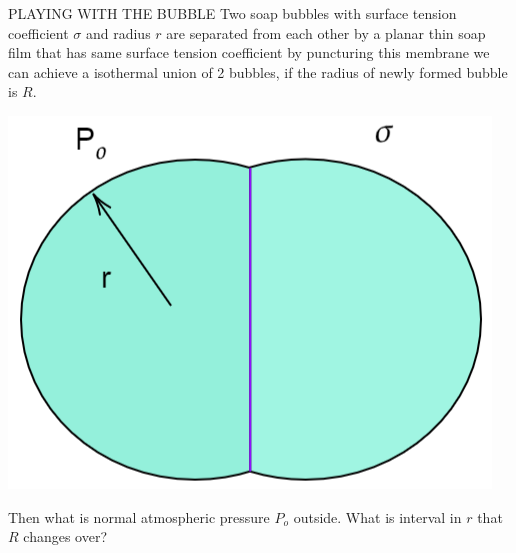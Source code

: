 \begin{qotdphybox}{PLAYING WITH THE BUBBLE}
Two soap bubbles with surface tension coefficient $\sigma$ and radius $r$ are separated from each other by a planar thin soap film that has same surface tension coefficient by puncturing this membrane we can achieve a isothermal union of 2 bubbles, if the radius of newly formed bubble is $R$.
\begin{center}
    \includegraphics[width = .4\textwidth]{QoTD 101.png}
    \label{fig:qotd101}
\end{center}
\begin{qotdques}
Then what is normal atmospheric pressure $P_o$ outside.
What is interval in $r$ that $R$  changes over?
\end{qotdques}
\end{qotdphybox}